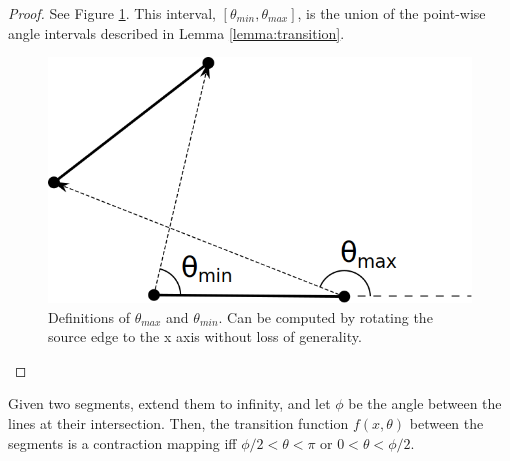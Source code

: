 \documentclass[]{styles/svproc}  %
\begin{document}
\begin{proof}

See Figure \ref{fig:bounce_range}. This interval, $[\theta_{min}, \theta_{max}]$, 
is the union of the point-wise angle intervals described in Lemma
\ref{lemma:transition}.

\begin{figure}
    \centering
    \includegraphics[width=0.4\linewidth]{figures/bouncerange.png}
    \caption{Definitions of $\theta_{max}$ and $\theta_{min}$. Can be computed
by rotating the source edge to the x axis without loss of generality.}
\label{fig:bounce_range}
\end{figure}
\end{proof}

\begin{lemma} \label{lemma:angrange}
Given two segments, extend them to infinity, and let $\phi$ be the angle between
the lines at their intersection. Then, the transition function $f(x, \theta)$ between
the segments is a contraction mapping iff $\phi/2 < \theta < \pi$ or $0 < \theta
< \phi/2$.
\end{lemma}
\end{document}
